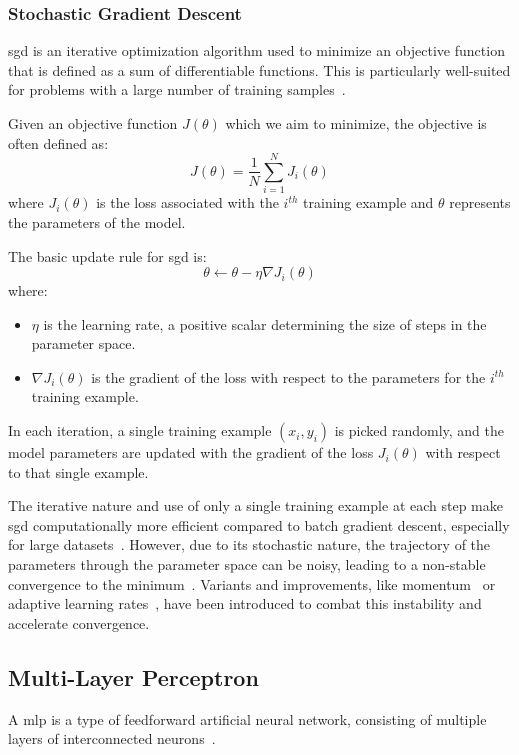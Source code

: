 \subsubsection{Stochastic Gradient Descent}

\gls{sgd} is an iterative optimization algorithm used to minimize an objective function that is defined as a sum of differentiable functions. This is particularly well-suited for problems with a large number of training samples~\cite{bottou2010large}.

Given an objective function \( J(\theta) \) which we aim to minimize, the objective is often defined as:
\[
J(\theta) = \frac{1}{N} \sum_{i=1}^{N} J_i(\theta)
\]
where \( J_i(\theta) \) is the loss associated with the \( i^{th} \) training example and \( \theta \) represents the parameters of the model.

The basic update rule for \gls{sgd} is:
\[
\theta \leftarrow \theta - \eta \nabla J_i(\theta)
\]
where:
\begin{itemize}
	\item \( \eta \) is the learning rate, a positive scalar determining the size of steps in the parameter space.
	\item \( \nabla J_i(\theta) \) is the gradient of the loss with respect to the parameters for the \( i^{th} \) training example.
\end{itemize}

In each iteration, a single training example \( (x_i, y_i) \) is picked randomly, and the model parameters are updated with the gradient of the loss \( J_i(\theta) \) with respect to that single example.

The iterative nature and use of only a single training example at each step make \gls{sgd} computationally more efficient compared to batch gradient descent, especially for large datasets~\cite{bottou2010large}. However, due to its stochastic nature, the trajectory of the parameters through the parameter space can be noisy, leading to a non-stable convergence to the minimum~\cite{bottou2018optimization}. Variants and improvements, like momentum~\cite{sutskever2013importance} or adaptive learning rates~\cite{duchi2011adaptive}, have been introduced to combat this instability and accelerate convergence.

\subsection{Multi-Layer Perceptron}

A \gls{mlp} is a type of feedforward artificial neural network, consisting of multiple layers of interconnected neurons~\cite{goodfellow2016deep}.

